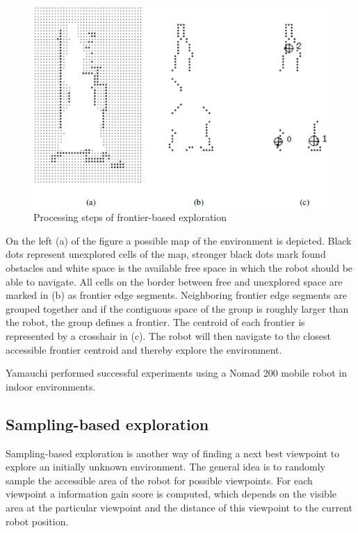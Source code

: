 \documentclass[a4paper,11pt,english]{article}
\begin{document}
\begin{figure}[h!]
	\begin{center}
		\includegraphics[width=1\textwidth]{src/frontier_exploration.png}
		\caption{ Processing steps of frontier-based exploration \cite{yamauchi1997frontier}}
		\label{fig:frontier}
	\end{center}
\end{figure}

On the left (a) of the figure a possible map of the environment is depicted. Black dots represent unexplored cells of the map, stronger black dots mark found obstacles and white space is the available free space in which the robot should be able to navigate.
All cells on the border between free and unexplored space are marked in (b) as frontier edge segments.
Neighboring frontier edge segments are grouped together and if the contiguous space of the group is roughly larger than the robot, the group defines a frontier. The centroid of each frontier is represented by a crosshair in (c).
The robot will then navigate to the closest accessible frontier centroid and thereby explore the environment.

Yamauchi performed successful experiments using a Nomad 200 mobile robot in indoor environments.

\subsection{Sampling-based exploration}
\label{Theoretical_background:Sampling-based_exploration}
Sampling-based exploration is another way of finding a next best viewpoint to explore an initially unknown environment.
The general idea is to randomly sample the accessible area of the robot for possible viewpoints.
For each viewpoint a information gain score is computed, which depends on the visible area at the particular viewpoint and the distance of this viewpoint to the current robot position.
\end{document}

